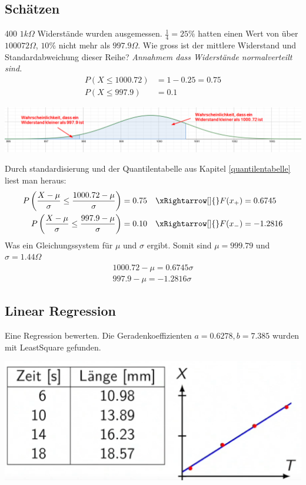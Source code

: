 \subsection{Schätzen}\label{konf_intervall}
400 $1k\Omega$ Widerstände wurden ausgemessen. $\frac{1}{4} = 25\%$ hatten einen Wert von über $1000
72\Omega$, $10\%$ nicht mehr als $997.9\Omega$. Wie gross ist der mittlere Widerstand und Standardabweichung dieser Reihe? \textit{Annahmem dass Widerstände normalverteilt sind.}
\begin{align*}
	P(X \le 1000.72) &= 1 - 0.25 = 0.75 \\
	P(X \le 997.9) &= 0.1
\end{align*}
\begin{center}
	\includegraphics[width=\columnwidth]{Images/schätzen}
\end{center}
Durch standardisierung und der Quantilentabelle aus Kapitel \ref{quantilentabelle} liest man heraus:
\begin{align*}
    P\left(\frac{X - \mu}{\sigma} \le \frac{1000.72 - \mu}{\sigma}\right) &= 0.75 & \xRightarrow[]{}	F(x_+) &= 0.6745 \\
	P\left(\frac{X - \mu}{\sigma} \le \frac{997.9 - \mu}{\sigma}\right) &= 0.10 & \xRightarrow[]{}	F(x_-) &= -1.2816
\end{align*}
Was ein Gleichungssystem für $\mu$ und $\sigma$ ergibt. Somit sind $\mu=999.79$ und $\sigma = 1.44\Omega$
\begin{align*}
	1000.72 - \mu = 0.6745\sigma \\
	997.9 - \mu = -1.2816\sigma
\end{align*}

\subsection{Linear Regression}\label{covarianz_eg}\label{regression}
Eine Regression bewerten. Die Geradenkoeffizienten $ a= 0.6278, b = 7.385$ wurden mit LeastSquare gefunden.
\begin{center}
	\includegraphics[width=0.5\columnwidth]{Images/regression}
\end{center}


